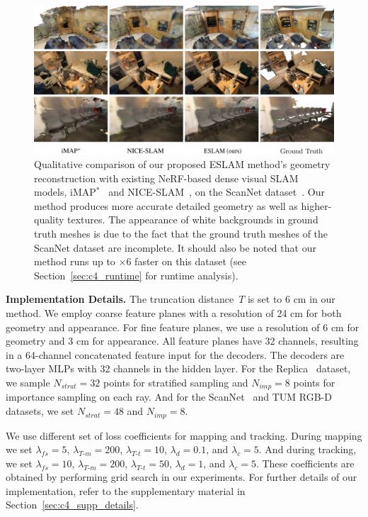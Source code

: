 \begin{figure}[t]
    \begin{center}
        \includegraphics[width=1.0\linewidth]{images/chapter4/figures/Fig5.jpg}
    \end{center}
    \caption{Qualitative comparison of our proposed ESLAM method's geometry reconstruction with existing NeRF-based dense visual SLAM models, iMAP$^*$~\citep{sucar2021imap} and NICE-SLAM~\citep{zhu2022nice}, on the ScanNet dataset~\citep{dai2017scannet}. Our method produces more accurate detailed geometry as well as higher-quality textures. The appearance of white backgrounds in ground truth meshes is due to the fact that the ground truth meshes of the ScanNet dataset are incomplete. It should also be noted that our method runs up to $\times$6 faster on this dataset (see Section~\ref{sec:c4_runtime} for runtime analysis).}
    \label{fig:c4_qualitative_scannet}
\end{figure}

\vspace{1ex}
\noindent\textbf{Implementation Details.} The truncation distance~$T$ is set to 6 cm in our method. We employ coarse feature planes with a resolution of 24 cm for both geometry and appearance. For fine feature planes, we use a resolution of 6 cm for geometry and 3 cm for appearance. All feature planes have 32 channels, resulting in a 64-channel concatenated feature input for the decoders. The decoders are two-layer MLPs with 32 channels in the hidden layer. For the Replica~\citep{replica19arxiv} dataset, we sample $N_{strat}=32$ points for stratified sampling and $N_{imp}=8$ points for importance sampling on each ray. And for the ScanNet~\citep{dai2017scannet} and TUM RGB-D~\citep{sturm2012benchmark} datasets, we set $N_{strat}=48$ and $N_{imp}=8$.

We use different set of loss coefficients for mapping and tracking. During mapping we set $\lambda_{fs}=5$, $\lambda_{T\text{-}m}=200$, $\lambda_{T\text{-}t}=10$, $\lambda_{d}=0.1$, and $\lambda_{c}=5$. And during tracking, we set $\lambda_{fs}=10$, $\lambda_{T\text{-}m}=200$, $\lambda_{T\text{-}t}=50$, $\lambda_{d}=1$, and $\lambda_{c}=5$. These coefficients are obtained by performing grid search in our experiments. For further details of our implementation, refer to the supplementary material in Section~\ref{sec:c4_supp_details}.

